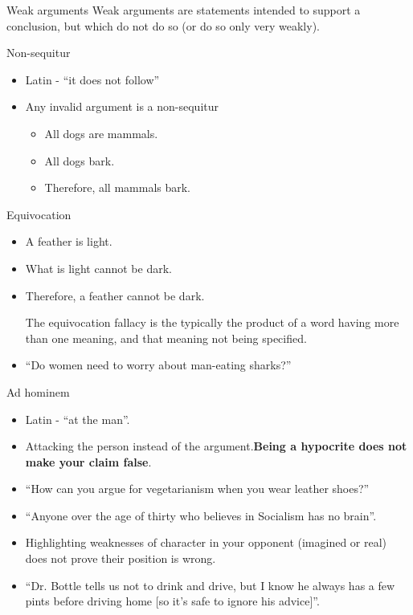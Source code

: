 \documentclass{beamer}
\begin{document}
\begin{frame}{Weak arguments}
Weak arguments are statements intended to support a conclusion, but which do not do so (or do so only very weakly). 
\end{frame}

\begin{frame}{Non-sequitur}
\begin{itemize}
\item Latin - ``it does not follow''
\item Any invalid argument is a non-sequitur
\begin{itemize}
	\item All dogs are mammals.
	\item All dogs bark.
	\item Therefore, all mammals bark.
\end{itemize}
\end{itemize}
\end{frame}

\begin{frame}{Equivocation}
\begin{itemize}
\item A feather is light.
\item What is light cannot be dark.
\item Therefore, a feather cannot be dark.

The equivocation fallacy is the typically the product of a word having more than one meaning, and that meaning not being specified. 

\item ``Do women need to worry about man-eating sharks?''
\end{itemize}
\end{frame}

\begin{frame}{Ad hominem}
\begin{itemize}
\item Latin - ``at the man''.
\item Attacking the person instead of the argument.\textbf{Being a hypocrite does not make your claim false}.
\item ``How can you argue for vegetarianism when you wear leather shoes?''
\item ``Anyone over the age of thirty who believes in Socialism has no brain''.
\item Highlighting weaknesses of character in your opponent (imagined or real) does not prove their position is wrong.
\item ``Dr. Bottle tells us not to drink and drive, but I know he always has a few pints before driving home [so it's safe to ignore his advice]''.

\end{itemize}
\end{frame}
\end{document}
